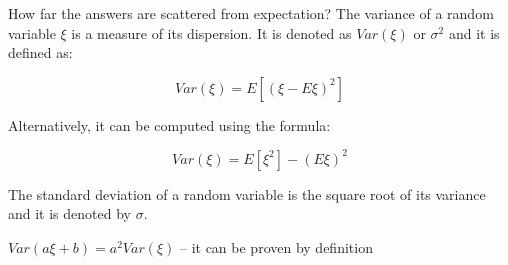 \documentclass[fullscreen=true, bookmarks=true, hyperref={pdfencoding=unicode}]{beamer}
\begin{document}
\begin{frame}{How far the answers are scattered from expectation?}
  The variance of a random variable $\xi$ is a measure of its dispersion. It is denoted as $Var(\xi)$ or $\sigma^2$ and it is defined as:
  
  \begin{equation*}
  Var(\xi) = E[(\xi - E\xi)^2]
  \end{equation*}
  
  Alternatively, it can be computed using the formula:
  
  \begin{equation*}
  Var(\xi) = E[\xi^2] - (E\xi)^2
  \end{equation*}
  
  The standard deviation of a random variable is the square root of its variance and it is denoted by $\sigma$.

  \pause
  \begin{center}
  \end{center}

  $Var(a\xi + b) = a^2 Var(\xi)$ -- it can be proven by definition
\end{frame}
\end{document}
